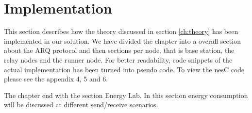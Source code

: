 \section{Implementation}\label{ch:implementation}

This section describes how the theory discussed in section \ref{ch:theory} has been implemented in our solution. We have divided the chapter into a overall section about the ARQ protocol and then sections per node, that is base station, the relay nodes and the runner node. For better readability, code snippets of the actual implementation has been turned into pseudo code. To view the nesC code please see the appendix 4, 5 and 6.

\noindent The chapter end with the section Energy Lab. In this section energy consumption will be discussed at different send/receive scenarios.









